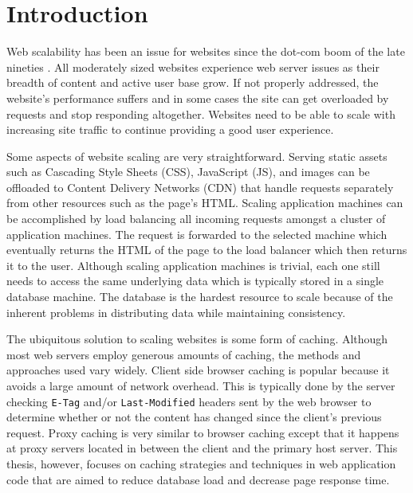 \documentclass[12pt]{ucthesis}
\begin{document}
\pagestyle{plain}




\renewcommand{\baselinestretch}{1.66}


\chapter{Introduction} \label{introduction}
Web scalability has been an issue for websites since the dot-com boom of the late nineties \cite{webServerScaling}.
All moderately sized websites experience web server issues as their breadth of content and active user base grow.
If not properly addressed, the website's performance suffers and in some cases the site can get overloaded by requests and stop responding altogether.
Websites need to be able to scale with increasing site traffic to continue providing a good user experience.

Some aspects of website scaling are very straightforward.
Serving static assets such as Cascading Style Sheets (CSS), JavaScript (JS), and images can be offloaded to Content Delivery Networks (CDN) that handle requests separately from other resources such as the page's HTML\@.
Scaling application machines can be accomplished by load balancing all incoming requests amongst a cluster of application machines.
The request is forwarded to the selected machine which eventually returns the HTML of the page to the load balancer which then returns it to the user.
Although scaling application machines is trivial, each one still needs to access the same underlying data which is typically stored in a single database machine.
The database is the hardest resource to scale because of the inherent problems in distributing data while maintaining consistency.

The ubiquitous solution to scaling websites is some form of caching.
Although most web servers employ generous amounts of caching, the methods and approaches used vary widely.
Client side browser caching is popular because it avoids a large amount of network overhead.
This is typically done by the server checking {\tt E-Tag} and/or {\tt Last-Modified} headers sent by the web browser to determine whether or not the content has changed since the client's previous request.
Proxy caching is very similar to browser caching except that it happens at proxy servers located in between the client and the primary host server.
This thesis, however, focuses on caching strategies and techniques in web application code that are aimed to reduce database load and decrease page response time.
\end{document}
